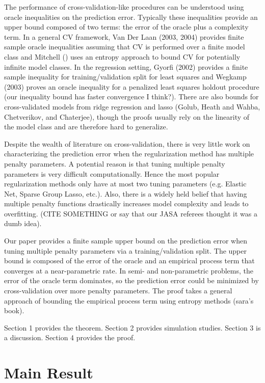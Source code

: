 \documentclass[12pt]{article}
\begin{document}
The performance of cross-validation-like procedures can be understood using oracle inequalities on the prediction error. Typically these inequalities provide an upper bound composed of two terms: the error of the oracle plus a complexity term. In a general CV framework, Van Der Laan (2003, 2004) provides finite sample oracle inequalities assuming that CV is performed over a finite model class and Mitchell () uses an entropy approach to bound CV for potentially infinite model classes. In the regression setting, Gyorfi (2002) provides a finite sample inequality for training/validation split for least squares and Wegkamp (2003) proves an oracle inequality for a penalized least squares holdout procedure (our inequality bound has faster convergence I think?). There are also bounds for cross-validated models from ridge regression and lasso (Golub, Heath and Wahba, Chetverikov, and Chaterjee), though the proofs usually rely on the linearity of the model class and are therefore hard to generalize.

Despite the wealth of literature on cross-validation, there is very little work on characterizing the prediction error when the regularization method has multiple penalty parameters. A potential reason is that tuning multiple penalty parameters is very difficult computationally. Hence the most popular regularization methods only have at most two tuning parameters (e.g. Elastic Net, Sparse Group Lasso, etc.). Also, there is a widely held belief that having multiple penalty functions drastically increases model complexity and leads to overfitting. (CITE SOMETHING or say that our JASA referees thought it was a dumb idea).

Our paper provides a finite sample upper bound on the prediction error when tuning multiple penalty parameters via a training/validation split. The upper bound is composed of the error of the oracle and an empirical process term that converges at a near-parametric rate. In semi- and non-parametric problems, the error of the oracle term dominates, so the prediction error could be minimized by cross-validation over more penalty parameters. The proof takes a general approach of bounding the empirical process term using entropy methods (sara's book).

Section 1 provides the theorem. Section 2 provides simulation studies. Section 3 is a discussion. Section 4 provides the proof.

\section{Main Result}
\end{document}
